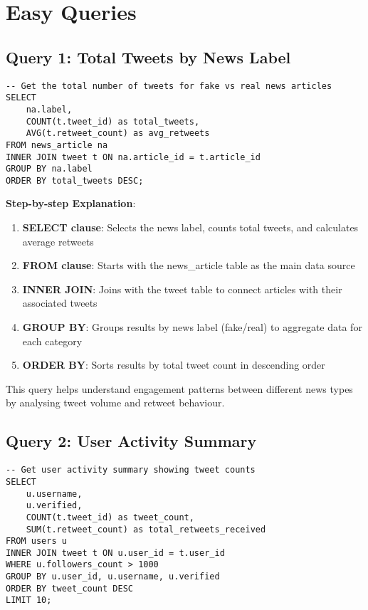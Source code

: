 \documentclass[12pt,a4paper]{report}
\begin{document}
\section{Easy Queries}

\subsection{Query 1: Total Tweets by News Label}
\begin{lstlisting}[caption={Easy Query 1}]
-- Get the total number of tweets for fake vs real news articles
SELECT 
    na.label,
    COUNT(t.tweet_id) as total_tweets,
    AVG(t.retweet_count) as avg_retweets
FROM news_article na
INNER JOIN tweet t ON na.article_id = t.article_id
GROUP BY na.label
ORDER BY total_tweets DESC;
\end{lstlisting}

\textbf{Step-by-step Explanation}:
\begin{enumerate}
    \item \textbf{SELECT clause}: Selects the news label, counts total tweets, and calculates average retweets
    \item \textbf{FROM clause}: Starts with the news\_article table as the main data source
    \item \textbf{INNER JOIN}: Joins with the tweet table to connect articles with their associated tweets
    \item \textbf{GROUP BY}: Groups results by news label (fake/real) to aggregate data for each category
    \item \textbf{ORDER BY}: Sorts results by total tweet count in descending order
\end{enumerate}
This query helps understand engagement patterns between different news types by analysing tweet volume and retweet behaviour.

\subsection{Query 2: User Activity Summary}
\begin{lstlisting}[caption={Easy Query 2}]
-- Get user activity summary showing tweet counts
SELECT 
    u.username,
    u.verified,
    COUNT(t.tweet_id) as tweet_count,
    SUM(t.retweet_count) as total_retweets_received
FROM users u
INNER JOIN tweet t ON u.user_id = t.user_id
WHERE u.followers_count > 1000
GROUP BY u.user_id, u.username, u.verified
ORDER BY tweet_count DESC
LIMIT 10;
\end{lstlisting}
\end{document}
